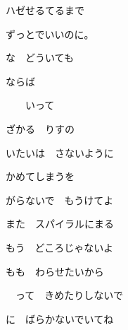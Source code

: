 \documentclass[a4paper,tate,twocolumn,12pt]{ltjtarticle}
\begin{document}
\thispagestyle{empty}

\begin{center}
{\LARGE ハゼせるてるまで}

{\large ずっとでいいのに。}
\end{center}

\vspace{1em}

\begin{flushleft}

\noindent\begin{minipage}{\linewidth}
な　どういても

ならば

　　いって

ざかる　りすの
\end{minipage}

\vspace{2em}

\noindent\begin{minipage}{\linewidth}
いたいは　さないように

かめてしまうを

がらないで　もうけてよ

また　スパイラルにまる
\end{minipage}

\vspace{2em}

\noindent\begin{minipage}{\linewidth}
もう　どころじゃないよ

もも　わらせたいから
\end{minipage}

\vspace{2em}

\noindent\begin{minipage}{\linewidth}
　って　きめたりしないで

に　ばらかないでいてね
\end{minipage}


\end{flushleft}
\end{document}
